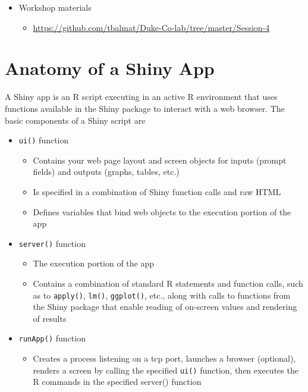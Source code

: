 \documentclass[10pt, letterpaper]{article}
\begin{document}
\begin{spacing}{1.0}
\begin{itemize}
  \item Workshop materials
    \begin{itemize}
        \item \url{https://github.com/tbalmat/Duke-Co-lab/tree/master/Session-4}
    \end{itemize}
\end{itemize}


\section{Anatomy of a Shiny App}\label{sec:anatomyofapp}

A Shiny app is an R script executing in an active R environment that uses functions available in the Shiny package to interact with a web browser.  The basic components of a Shiny script are

\begin{itemize}
    \item \texttt{ui()} function
    \begin{itemize}
        \item Contains your web page layout and screen objects for inputs (prompt fields) and outputs (graphs, tables, etc.)
        \item Is specified in a combination of Shiny function calls and raw HTML
        \item Defines variables that bind web objects to the execution portion of the app
    \end{itemize}
    \item \texttt{server()} function
    \begin{itemize}
        \item The execution portion of the app
        \item Contains a combination of standard R statements and function calls, such as to \texttt{apply()}, \texttt{lm()}, \texttt{ggplot()}, etc., along with calls to functions from the Shiny package that enable reading of on-screen values and rendering of results
    \end{itemize}
    \item \texttt{runApp()} function
    \begin{itemize}
        \item Creates a process listening on a tcp port, launches a browser (optional), renders a screen by calling the specified \texttt{ui()} function, then executes the R commands in the specified server() function
    \end{itemize}
\end{itemize}


\end{spacing}
\end{document}
